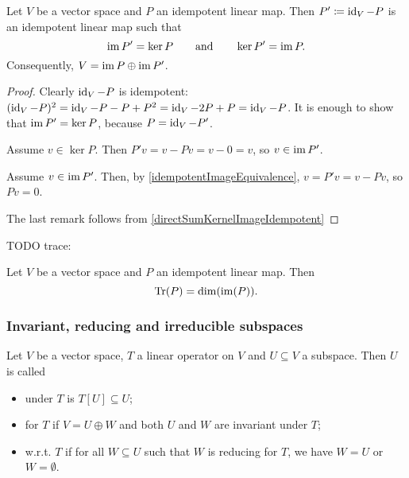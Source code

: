 \begin{lemma}
Let $V$ be a vector space and $P$ an idempotent linear map. Then $P' \coloneqq \operatorname{id}_V - P$ is an idempotent linear map such that
\[ \operatorname{im} P' = \ker P \qquad\text{and}\qquad \ker P' = \operatorname{im} P. \]
Consequently, $V = \operatorname{im} P\oplus \operatorname{im} P'$.
\end{lemma}
\begin{proof}
Clearly $\operatorname{id}_V - P$ is idempotent: $(\operatorname{id}_V - P)^2 = \operatorname{id}_V - P - P + P^2 = \operatorname{id}_V - 2P + P = \operatorname{id}_V - P$. It is enough to show that $\operatorname{im} P' = \ker P$, because $P = \operatorname{id}_V - P'$.

Assume $v\in \ker P$. Then $P'v = v - Pv = v-0 = v$, so $v\in \operatorname{im} P'$.

Assume $v\in \operatorname{im} P'$. Then, by \ref{idempotentImageEquivalence}, $v = P'v = v - Pv$, so $Pv = 0$.

The last remark follows from \ref{directSumKernelImageIdempotent}
\end{proof}



TODO trace:
\begin{lemma}
Let $V$ be a vector space and $P$ an idempotent linear map. Then
\[ \operatorname{Tr}(P) = \dim(\operatorname{im}(P)). \]
\end{lemma}


\subsubsection{Invariant, reducing and irreducible subspaces}
\begin{definition}
Let $V$ be a vector space, $T$ a linear operator on $V$ and $U\subseteq V$ a subspace. Then $U$ is called
\begin{itemize}
    \item {} under $T$ is $T[U]\subseteq U$;
    \item {} for $T$ if $V = U\oplus W$ and both $U$ and $W$ are invariant under $T$;
    \item {} w.r.t. $T$ if for all $W\subseteq U$ such that $W$ is reducing for $T$, we have $W = U$ or $W = \emptyset$.
\end{itemize}
\end{definition}


